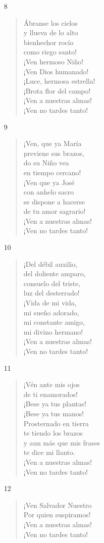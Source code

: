\documentclass[spanish,utf8,twocolumn]{chlart}
\newenvironment{gozo}{\begin{verse}\color{lector}}{\end{verse}}
\newcommand*\vena{{\color{responden}\hspace{1em}¡Ven a nuestras almas!\\\hspace{1em}¡Ven no tardes tanto!}}
\begin{document}
8
\begin{gozo}
Ábranse los cielos\\
y llueva de lo alto\\
bienhechor rocío\\
como riego santo!\\
¡Ven hermoso Niño!\\
¡Ven Dios humanado!\\
¡Luce, hermosa estrella!\\
¡Brota flor del campo!\\
\vena
\end{gozo}

9
\begin{gozo}
¡Ven, que ya María\\
previene sus brazos,\\
do su Niño vea\\
en tiempo cercano!\\
¡Ven que ya José\\
con anhelo sacro\\
se dispone a hacerse\\
de tu amor sagrario!\\
\vena
\end{gozo}

10
\begin{gozo}
¡Del débil auxilio,\\
del doliente amparo,\\
consuelo del triste,\\
luz del desterrado!\\
¡Vida de mi vida,\\
mi sueño adorado,\\
mi constante amigo,\\
mi divino hermano!\\
\vena
\end{gozo}

11
\begin{gozo}
¡Vén ante mis ojos\\
de ti enamorados!\\
¡Bese ya tus plantas!\\
¡Bese ya tus manos!\\
Prosternado en tierra\\
te tiendo los brazos\\
y aun más que mis frases\\
te dice mi llanto.\\
\vena
\end{gozo}

12
\begin{gozo}
¡Ven Salvador Nuestro\\
Por quien suspiramos!\\
\vena
\end{gozo}
\end{document}
